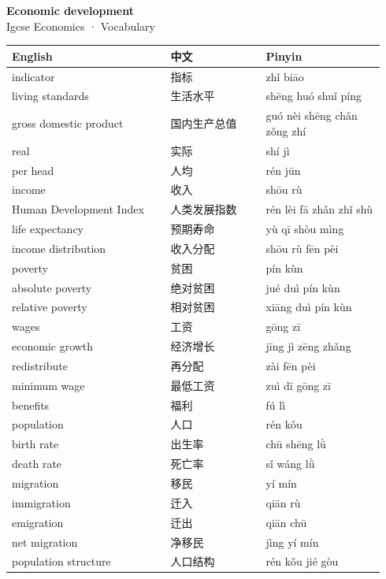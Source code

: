 \documentclass[11pt]{article}
\begin{document}
\begin{center}
  {\LARGE\bfseries Economic development}\\[0.35em]
  {\large Igcse Economics · Vocabulary}
\end{center}
\vspace{0.6em}

\begin{longtable}{@{}p{0.40\linewidth}p{0.24\linewidth}p{0.30\linewidth}@{}}
\toprule
\textbf{English} & \textbf{中文} & \textbf{Pinyin} \\
\midrule
\endhead
\bottomrule
\endlastfoot
indicator & 指标 & zhǐ biāo \\
living standards & 生活水平 & shēng huó shuǐ píng \\
gross domestic product & 国内生产总值 & guó nèi shēng chǎn zǒng zhí \\
real & 实际 & shí jì \\
per head & 人均 & rén jūn \\
income & 收入 & shōu rù \\
Human Development Index & 人类发展指数 & rén lèi fā zhǎn zhǐ shù \\
life expectancy & 预期寿命 & yù qī shòu mìng \\
income distribution & 收入分配 & shōu rù fēn pèi \\
poverty & 贫困 & pín kùn \\
absolute poverty & 绝对贫困 & jué duì pín kùn \\
relative poverty & 相对贫困 & xiāng duì pín kùn \\
wages & 工资 & gōng zī \\
economic growth & 经济增长 & jīng jì zēng zhǎng \\
redistribute & 再分配 & zài fēn pèi \\
minimum wage & 最低工资 & zuì dī gōng zī \\
benefits & 福利 & fú lì \\
population & 人口 & rén kǒu \\
birth rate & 出生率 & chū shēng lǜ \\
death rate & 死亡率 & sǐ wáng lǜ \\
migration & 移民 & yí mín \\
immigration & 迁入 & qiān rù \\
emigration & 迁出 & qiān chū \\
net migration & 净移民 & jìng yí mín \\
population structure & 人口结构 & rén kǒu jié gòu \\

\end{longtable}
\end{document}
